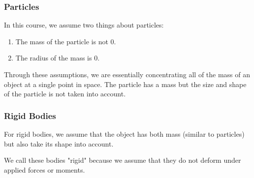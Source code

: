 \subsubsection{Particles}

In this course, we assume two things about particles: 

\begin{enumerate}
    \item{The mass of the particle is not 0.}
    \item{The radius of the mass is 0.}
\end{enumerate}

\noindent Through these assumptions, we are essentially concentrating all of the mass of an object at a single point in space. The particle has a mass but the size and shape of the particle is not taken into account. 

\subsubsection{Rigid Bodies}

For rigid bodies, we assume that the object has both mass (similar to particles) but also take its shape into account. 

We call these bodies "rigid" because we assume that they do not deform under applied forces or moments. 


